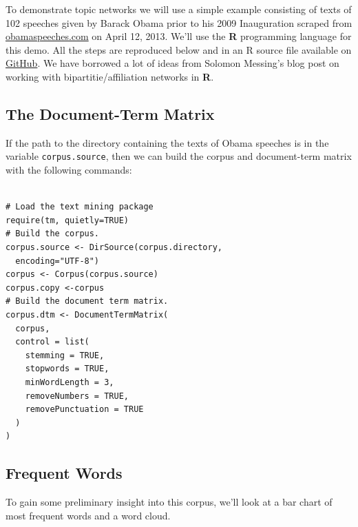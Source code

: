 \documentclass[%
	final,
	notitlepage,
	narroweqnarray,
	inline,
	]{ieee}
\begin{document}
\PARstart To demonstrate topic networks we will use a simple example consisting of
texts of 102 speeches given by Barack Obama prior to his 2009 Inauguration scraped from 
\href{http://obamaspeeches.com/}{obamaspeeches.com}\cite{speeches} on April 12, 2013.
We'll use the {\bf R} programming language\cite{cran} for this demo. All the steps
are reproduced below and in an R source file available on
\href{https://github.com/bobflagg/Topic-Networks}{GitHub}\cite{github}. We have
borrowed a lot of ideas from Solomon Messing's blog post\cite{messing} on 
working with bipartitie/affiliation networks in {\bf R}.

\subsection{The Document-Term Matrix}

\PARstart If the path to the directory containing the texts of Obama speeches is in
the variable {\tt corpus.source}, then we can build the corpus and document-term matrix
with the following commands:

\begin{verbatim}

# Load the text mining package
require(tm, quietly=TRUE)
# Build the corpus.
corpus.source <- DirSource(corpus.directory, 
  encoding="UTF-8")
corpus <- Corpus(corpus.source)
corpus.copy <-corpus
# Build the document term matrix.
corpus.dtm <- DocumentTermMatrix(
  corpus, 
  control = list(
    stemming = TRUE, 
    stopwords = TRUE, 
    minWordLength = 3,
    removeNumbers = TRUE, 
    removePunctuation = TRUE
  )
)
\end{verbatim}

\subsection{Frequent Words}

\PARstart To gain some preliminary insight into this corpus, we'll 
look at a bar chart of most frequent words and a word cloud.
\end{document}
